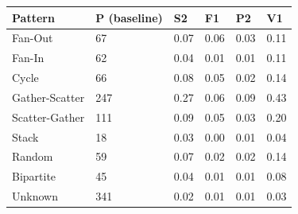 \begin{tabular}{llllll}
\toprule
Pattern & P (baseline) & S2 & F1 & P2 & V1 \\
\midrule
Fan-Out & 67 & 0.07 & 0.06 & 0.03 & 0.11 \\
Fan-In & 62 & 0.04 & 0.01 & 0.01 & 0.11 \\
Cycle & 66 & 0.08 & 0.05 & 0.02 & 0.14 \\
Gather-Scatter & 247 & 0.27 & 0.06 & 0.09 & 0.43 \\
Scatter-Gather & 111 & 0.09 & 0.05 & 0.03 & 0.20 \\
Stack & 18 & 0.03 & 0.00 & 0.01 & 0.04 \\
Random & 59 & 0.07 & 0.02 & 0.02 & 0.14 \\
Bipartite & 45 & 0.04 & 0.01 & 0.01 & 0.08 \\
Unknown & 341 & 0.02 & 0.01 & 0.01 & 0.03 \\
\bottomrule
\end{tabular}
